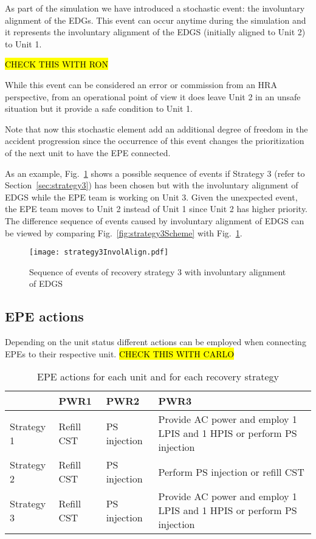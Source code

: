 As part of the simulation we have introduced a stochastic event: the involuntary alignment of the EDGs.
This event can occur anytime during the simulation and it represents the involuntary alignment of the EDGS 
(initially aligned to Unit 2) to Unit 1. 

\hl{CHECK THIS WITH RON}

While this event can be considered an error or commission from an HRA perspective, from an operational point of view 
it does leave Unit 2 in an unsafe situation but it provide a safe condition to Unit 1. 

Note that now this stochastic element add an additional degree of freedom in the accident progression since the 
occurrence of this event changes the prioritization of the next unit to have the EPE connected.

As an example, Fig.~\ref{fig:strategy3SchemeInvolAlign} shows a possible sequence of events if Strategy 3 
(refer to Section~\ref{sec:strategy3}) has been chosen but with the involuntary alignment of EDGS while the EPE team
is working on Unit 3. Given the unexpected event, the EPE team moves to Unit 2 instead of Unit 1 since Unit 2
has higher priority. The difference sequence of events caused by involuntary alignment of EDGS can be viewed
by comparing Fig.~\ref{fig:strategy3Scheme} with Fig.~\ref{fig:strategy3SchemeInvolAlign}.

\begin{figure}
  \centering
  \centerline{\texttt{[image: strategy3InvolAlign.pdf]}}
  \caption{Sequence of events of recovery strategy 3 with involuntary alignment of EDGS}
  \label{fig:strategy3SchemeInvolAlign}
\end{figure}

\subsection{EPE actions}
\label{sec:EPEactions}

Depending on the unit status different actions can be employed when connecting EPEs to their respective unit.
\hl{CHECK THIS WITH CARLO}

\begin{table}
  \begin{tabular}{|l|l|l|p{5cm}|}
     \hline
                 & PWR1       & PWR2         & PWR3                                                                   \\ \hline \hline
     Strategy 1  & Refill CST & PS injection & Provide AC power and employ 1 LPIS and 1 HPIS or perform PS injection  \\ \hline
     Strategy 2  & Refill CST & PS injection & Perform PS injection or refill CST                                     \\ \hline
     Strategy 3  & Refill CST & PS injection & Provide AC power and employ 1 LPIS and 1 HPIS or perform PS injection  \\ \hline
  \end{tabular}
  \caption{EPE actions for each unit and for each recovery strategy}
  \label{fig:EPEactions}
\end{table} 

